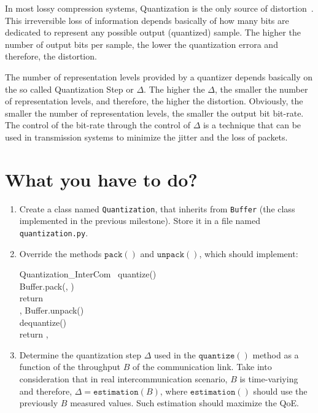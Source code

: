 In most lossy compression systems, Quantization is the only source of
distortion~\cite{taubman}. This irreversible loss of information
depends basically of how many bits are dedicated to represent any
possible output (quantized) sample. The higher the number of output
bits per sample, the lower the quantization errora and therefore, the
distortion.

The number of representation levels provided by a quantizer depends
basically on the so called Quantization Step or $\Delta$. The higher
the $\Delta$, the smaller the number of representation levels, and
therefore, the higher the distortion. Obviously, the smaller the
number of representation levels, the smaller the output bit
bit-rate. The control of the bit-rate through the control of $\Delta$
is a technique that can be used in transmission systems to minimize
the jitter and the loss of packets.

\section{What you have to do?}

\begin{enumerate}
\item Create a class named \texttt{Quantization}, that inherits from
  \texttt{Buffer} (the class implemented in the previous
  milestone). Store it in a file named \texttt{quantization.py}.
\item Override the methods $\mathtt{pack()}$ and $\mathtt{unpack()}$,
  which should implement:

\begin{pseudocode}{Quantization\_InterCom}{~}
  \BEGIN
     \GETS quantize()\\
     \GETS Buffer.pack(, )\\
    return \\
  \END
  \ENDPROCEDURE
  \BEGIN
    ,  \GETS Buffer.unpack()\\
     \GETS dequantize()\\
    return , 
  \END
  \ENDPROCEDURE
\end{pseudocode}

\item Determine the quantization step $\Delta$ used in the
  $\mathtt{quantize()}$ method as a function of the throughput $B$ of
  the communication link. Take into consideration that in real
  intercommunication scenario, $B$ is time-variying and therefore,
  $\Delta = \mathtt{estimation}(B)$, where $\mathtt{estimation()}$
  should use the previously $B$ measured values. Such estimation
  should maximize the QoE.
\end{enumerate}

